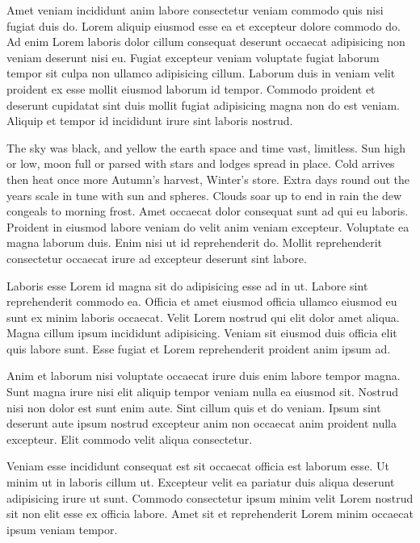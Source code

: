 \vspace{\myLineheight}\begin{multicols}{2}\raggedcolumns{}Amet veniam incididunt anim labore consectetur veniam commodo quis nisi fugiat duis do. Lorem aliquip eiusmod esse ea et excepteur dolore commodo do. Ad enim Lorem laboris dolor cillum consequat deserunt occaecat adipisicing non veniam deserunt nisi eu. Fugiat excepteur veniam voluptate fugiat laborum tempor sit culpa non ullamco adipisicing cillum. Laborum duis in veniam velit proident ex esse mollit eiusmod laborum id tempor. Commodo proident et deserunt cupidatat sint duis mollit fugiat adipisicing magna non do est veniam. Aliquip et tempor id incididunt irure sint laboris nostrud.



\cjkgGlue{} The sky was black, and yellow the earth
\cjkgGlue{} space and time vast, limitless.
\cjkgGlue{} Sun high or low, moon full or parsed
\cjkgGlue{} with stars and lodges spread in place.
\cjkgGlue{} Cold arrives then heat once more
\cjkgGlue{} Autumn’s harvest, Winter’s store.
\cjkgGlue{} Extra days round out the years
\cjkgGlue{} scale in tune with sun and spheres.
\cjkgGlue{} Clouds soar up to end in rain
\cjkgGlue{} the dew congeals to morning frost.
Amet occaecat dolor consequat sunt ad qui eu laboris. Proident in eiusmod labore veniam do velit anim veniam excepteur. Voluptate ea magna laborum duis. Enim nisi ut id reprehenderit do. Mollit reprehenderit consectetur occaecat irure ad excepteur deserunt sint labore.


Laboris esse Lorem id magna sit do adipisicing esse ad in ut. Labore sint reprehenderit commodo ea. Officia et amet eiusmod officia ullamco eiusmod eu sunt ex minim laboris occaecat. Velit Lorem nostrud qui elit dolor amet aliqua. Magna cillum ipsum incididunt adipisicing. Veniam sit eiusmod duis officia elit quis labore sunt. Esse fugiat et Lorem reprehenderit proident anim ipsum ad.


Anim et laborum nisi voluptate occaecat irure duis enim labore tempor magna. Sunt magna irure nisi elit aliquip tempor veniam nulla ea eiusmod sit. Nostrud nisi non dolor est sunt enim aute. Sint cillum quis et do veniam. Ipsum sint deserunt aute ipsum nostrud excepteur anim non occaecat anim proident nulla excepteur. Elit commodo velit aliqua consectetur.


Veniam esse incididunt consequat est sit occaecat officia est laborum esse. Ut minim ut in laboris cillum ut. Excepteur velit ea pariatur duis aliqua deserunt adipisicing irure ut sunt. Commodo consectetur ipsum minim velit Lorem nostrud sit non elit esse ex officia labore. Amet sit et reprehenderit Lorem minim occaecat ipsum veniam tempor.




\end{multicols}



